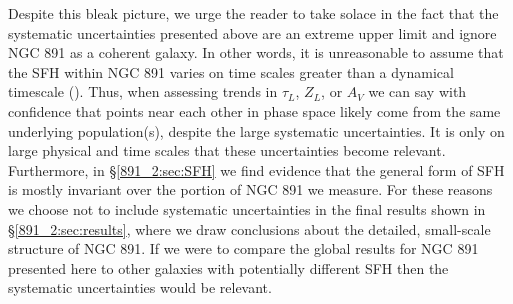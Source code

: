 Despite this bleak picture, we urge the reader to take solace in the
fact that the systematic uncertainties presented above are an extreme
upper limit and ignore NGC 891 as a coherent galaxy. In other words,
it is unreasonable to assume that the SFH within NGC 891 varies on
time scales greater than a dynamical timescale (). Thus, when assessing trends in $\tau_L$, $Z_L$, or $A_V$ we
can say with confidence that points near each other in phase space
likely come from the same underlying population(s), despite the large
systematic uncertainties. It is only on large physical and time scales
that these uncertainties become relevant. Furthermore, in
\S\ref{891_2:sec:SFH} we find evidence that the general form of SFH is
mostly invariant over the portion of NGC 891 we measure. For these
reasons we choose not to include systematic uncertainties in the final
results shown in \S\ref{891_2:sec:results}, where we draw conclusions about
the detailed, small-scale structure of NGC 891. If we were to compare
the global results for NGC 891 presented here to other galaxies with
potentially different SFH then the systematic uncertainties would be
relevant.


